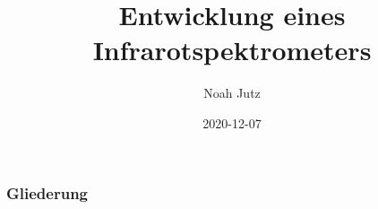 \documentclass{beamer}
\title{Entwicklung eines Infrarotspektrometers}
\author{Noah Jutz}
\institute{Privat-Gymnasium PINDL Regensburg}
\date{2020-12-07}
\begin{document}
\frame{\titlepage}

\begin{frame}
    \frametitle{Gliederung}
    \tableofcontents
\end{frame}
\end{document}
